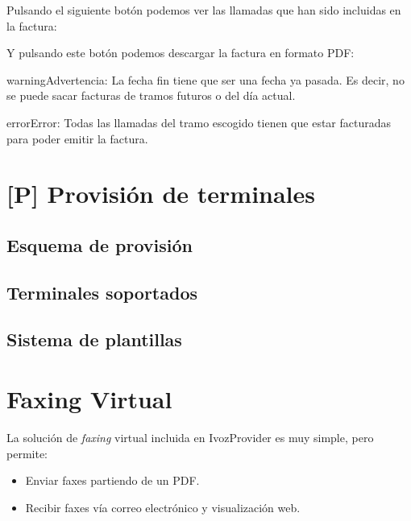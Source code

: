 \documentclass[letterpaper,10pt,spanish]{sphinxmanual}
\begin{document}
Pulsando el siguiente botón podemos ver las llamadas que han sido incluidas en la factura:


Y pulsando este botón podemos descargar la factura en formato PDF:


\begin{notice}{warning}{Advertencia:}
La fecha fin tiene que ser una fecha ya pasada. Es decir, no se puede sacar facturas de tramos futuros o del día actual.
\end{notice}

\begin{notice}{error}{Error:}
Todas las llamadas del tramo escogido tienen que estar facturadas para poder emitir la factura.
\end{notice}


\chapter{{[}P{]} Provisión de terminales}
\label{provisioning/index:p-provision-de-terminales}\label{provisioning/index::doc}\label{provisioning/index:provisioning}

\section{Esquema de provisión}
\label{provisioning/index:esquema-de-provision}

\section{Terminales soportados}
\label{provisioning/index:terminales-soportados}

\section{Sistema de plantillas}
\label{provisioning/index:sistema-de-plantillas}

\chapter{Faxing Virtual}
\label{faxing/index::doc}\label{faxing/index:faxing-system}\label{faxing/index:faxing-virtual}
La solución de \emph{faxing} virtual incluida en IvozProvider es muy simple, pero permite:
\begin{itemize}
\item {} 
Enviar faxes partiendo de un PDF.

\item {} 
Recibir faxes vía correo electrónico y visualización web.

\end{itemize}
\end{document}
